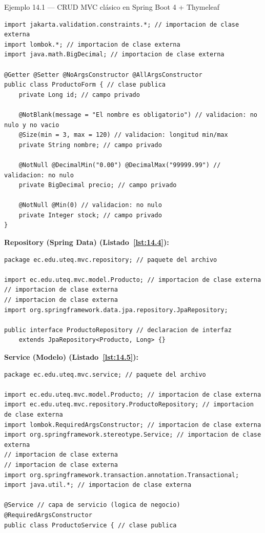 \begin{cajaejemplo}{Ejemplo 14.1 --- CRUD MVC clásico en Spring Boot 4 + Thymeleaf}
\begin{lstlisting}[style=java,caption={ProductoForm.java},label=lst:14.3]
import jakarta.validation.constraints.*; // importacion de clase externa
import lombok.*; // importacion de clase externa
import java.math.BigDecimal; // importacion de clase externa

@Getter @Setter @NoArgsConstructor @AllArgsConstructor
public class ProductoForm { // clase publica
    private Long id; // campo privado

    @NotBlank(message = "El nombre es obligatorio") // validacion: no nulo y no vacio
    @Size(min = 3, max = 120) // validacion: longitud min/max
    private String nombre; // campo privado

    @NotNull @DecimalMin("0.00") @DecimalMax("99999.99") // validacion: no nulo
    private BigDecimal precio; // campo privado

    @NotNull @Min(0) // validacion: no nulo
    private Integer stock; // campo privado
}
\end{lstlisting}

\textbf{Repository (Spring Data) (Listado~\ref{lst:14.4}):}
\begin{lstlisting}[style=java,caption={ProductoRepository.java},label=lst:14.4]
package ec.edu.uteq.mvc.repository; // paquete del archivo

import ec.edu.uteq.mvc.model.Producto; // importacion de clase externa
// importacion de clase externa
// importacion de clase externa
import org.springframework.data.jpa.repository.JpaRepository;

public interface ProductoRepository // declaracion de interfaz
    extends JpaRepository<Producto, Long> {}
\end{lstlisting}

\textbf{Service (Modelo) (Listado~\ref{lst:14.5}):}
\begin{lstlisting}[style=java,caption={ProductoService.java},label=lst:14.5]
package ec.edu.uteq.mvc.service; // paquete del archivo

import ec.edu.uteq.mvc.model.Producto; // importacion de clase externa
import ec.edu.uteq.mvc.repository.ProductoRepository; // importacion de clase externa
import lombok.RequiredArgsConstructor; // importacion de clase externa
import org.springframework.stereotype.Service; // importacion de clase externa
// importacion de clase externa
// importacion de clase externa
import org.springframework.transaction.annotation.Transactional;
import java.util.*; // importacion de clase externa

@Service // capa de servicio (logica de negocio)
@RequiredArgsConstructor
public class ProductoService { // clase publica


\end{lstlisting}
\end{cajaejemplo}
